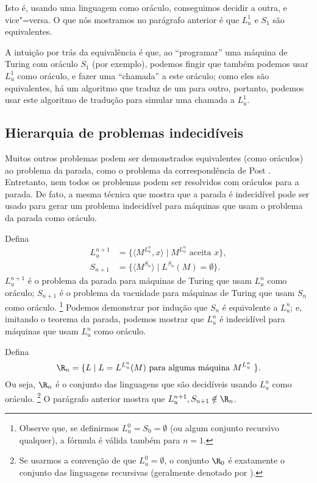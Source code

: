 Isto é, usando uma linguagem como oráculo, conseguimos decidir a outra,
e vice"=versa.
O que nós mostramos no parágrafo anterior é que
$L_u^1$ e $S_1$ são equivalentes.

A intuição por trás da equivalência é que,
ao ``programar'' uma máquina de Turing com oráculo $S_1$ (por exemplo),
podemos fingir que também podemos usar $L_u^1$ como oráculo,
e fazer uma ``chamada'' a este oráculo;
como eles são equivalentes,
há um algoritmo que traduz de um para outro,
portanto, podemos usar este algoritmo de tradução
para simular uma chamada a $L_u^1$.

\subsection{Hierarquia de problemas indecidíveis}

Muitos outros problemas podem ser demonstrados equivalentes
(como oráculos)
ao problema da parada,
como o problema da correspondência de Post \cite[p.~214]{HopcroftUllman1979}.
Entretanto,
nem todos os problemas podem ser resolvidos com oráculos para a parada.
De fato, a mesma técnica que mostra que a parada é indecidível
pode ser usado para gerar um problema indecidível
para máquinas que usam o problema da parada como oráculo.

Defina
\begin{align*}
    L_u^{n+1} &= \{ \langle M^{L_u^n}, x \rangle \mid M^{L_u^n} \text{ aceita } x \}, \\
    S_{n+1} &= \{ \langle M^{S_n} \rangle \mid L^{S_n}(M) = \emptyset \}.
\end{align*}
$L_u^{n+1}$ é o problema da parada
para máquinas de Turing que usam $L_u^n$ como oráculo;
$S_{n+1}$ é o problema da vacuidade
para máquinas de Turing que usam $S_n$ como oráculo.%
\footnote{
    Observe que,
    se definirmos $L_u^0 = S_0 = \emptyset$
    (ou algum conjunto recursivo qualquer),
    a fórmula é válida também para $n = 1$.
}
Podemos demonstrar por indução que $S_n$ é equivalente a $L_u^n$;
e, imitando o teorema da parada,
podemos mostrar que $L_u^n$ é indecidível para máquinas que usam $L_u^n$ como oráculo.

Defina
\begin{equation*}
    \R_n = \{ L \mid L = L^{L_u^n}(M) \text{ para alguma máquina $M^{L_u^n}$ } \}.
\end{equation*}
Ou seja, $\R_n$ é o conjunto das linguagens
que são decidíveis usando $L_u^n$ como oráculo.%
\footnote{
    Se usarmos a convenção de que $L_u^0 = \emptyset$,
    o conjunto $\R_0$ é exatamente o conjunto das linguagens recursivas
    (geralmente denotado por \R).
}
O parágrafo anterior mostra que $L_u^{n+1}, S_{n+1} \notin \R_n$.

